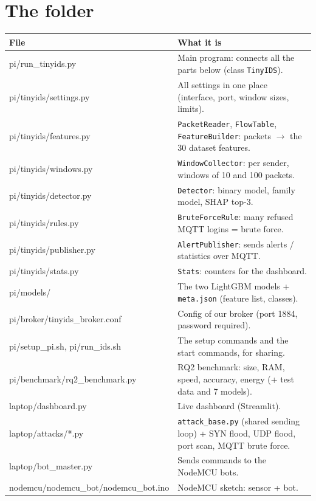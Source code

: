 \documentclass[11pt]{article}
\begin{document}
\section{The folder}
\begin{longtable}{@{}>{\ttfamily\small\raggedright}p{6.4cm} >{\raggedright\arraybackslash}p{9.4cm}@{}}
\toprule
\textrm{\textbf{File}} & \textbf{What it is} \\
\midrule
\endhead
pi/run\_tinyids.py & Main program: connects all the parts below (class \texttt{TinyIDS}). \\
pi/tinyids/settings.py & All settings in one place (interface, port, window sizes, limits). \\
pi/tinyids/features.py & \texttt{PacketReader}, \texttt{FlowTable}, \texttt{FeatureBuilder}: packets $\rightarrow$ the 30 dataset features. \\
pi/tinyids/windows.py & \texttt{WindowCollector}: per sender, windows of 10 and 100 packets. \\
pi/tinyids/detector.py & \texttt{Detector}: binary model, family model, SHAP top-3. \\
pi/tinyids/rules.py & \texttt{BruteForceRule}: many refused MQTT logins = brute force. \\
pi/tinyids/publisher.py & \texttt{AlertPublisher}: sends alerts / statistics over MQTT. \\
pi/tinyids/stats.py & \texttt{Stats}: counters for the dashboard. \\
pi/models/ & The two LightGBM models + \texttt{meta.json} (feature list, classes). \\
pi/broker/tinyids\_broker.conf & Config of our broker (port 1884, password required). \\
pi/setup\_pi.sh, pi/run\_ids.sh & The setup commands and the start commands, for sharing. \\
pi/benchmark/rq2\_benchmark.py & RQ2 benchmark: size, RAM, speed, accuracy, energy (+ test data and 7 models). \\
laptop/dashboard.py & Live dashboard (Streamlit). \\
laptop/attacks/*.py & \texttt{attack\_base.py} (shared sending loop) + SYN flood, UDP flood, port scan, MQTT brute force. \\
laptop/bot\_master.py & Sends commands to the NodeMCU bots. \\
nodemcu/nodemcu\_bot/nodemcu\_bot.ino & NodeMCU sketch: sensor + bot. \\
\bottomrule
\end{longtable}
\end{document}
